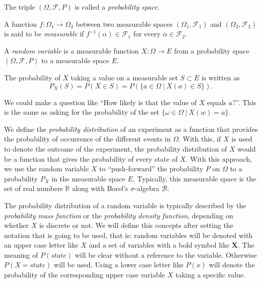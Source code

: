 The triple \((\Omega, \mathcal{F}, P)\) is called a \emph{probability space}.

\begin{definition}
A function \(f:\Omega_1 \to \Omega_2\) between two
measurable spaces \((\Omega_1, \mathcal{F}_1)\) and \((\Omega_2, \mathcal{F}_2)\) is said to be \emph{measurable} if \(f^{-1}(\alpha) \in \mathcal{F}_1\) for every \(\alpha \in \mathcal{F}_2\).
\end{definition}

\begin{definition}
A \emph{random variable} is a measurable function \(X:\Omega \to E\) from a probability
space \((\Omega, \mathcal{F}, P)\) to a measurable space \(E\).

The probability of \(X\) taking a value on a measurable set \(S \subset E\) is
written as
\[
P_X(S) = P(X \in S) = P(\{a \in \Omega \ | \ X(a) \in S \}).
\]
\end{definition}

We could make a question like ``How likely is that the value of \(X\) equals
\(a\)?''. This is the same as asking for the probability of the set \(\{\omega
\in \Omega \ | \ X(w) = a\}\).

We define the \emph{probability distribution} of
an experiment as a function that provides the probability
of occurrence of the different events in \(\Omega\). With this, if  \(X\) is used to denote the outcome of the experiment, the probability
distribution of \(X\) would be a function that gives the probability of every
state of \(X\). With this approach, we use the random variable \(X\) to
``push-forward'' the probability \(P\) on \(\Omega\) to a probability \(P_X\) in
the measurable space \(E\). Typically, this
measurable space is the set of real numbers \(\mathbb{R}\) along with Borel's
\(\sigma\)-algebra \(\mathcal{B}\).

The probability distribution of a random variable is typically described by the \emph{probability
  mass function} or the \emph{probability density function}, depending on
whether \(X\) is discrete or not. We will define this concepts after setting the
notation that is going to be used, that is: random variables will be
denoted with an upper case letter like \(X\) and a set of variables with a
bold symbol like \(\bm{X}\). The meaning of \(P(state)\) will be clear without a reference to the variable.
Otherwise \(P(X = state)\) will be used.
Using a lower case letter like \(P(x)\) will denote the probability of the
corresponding upper case variable \(X\) taking a specific value.

